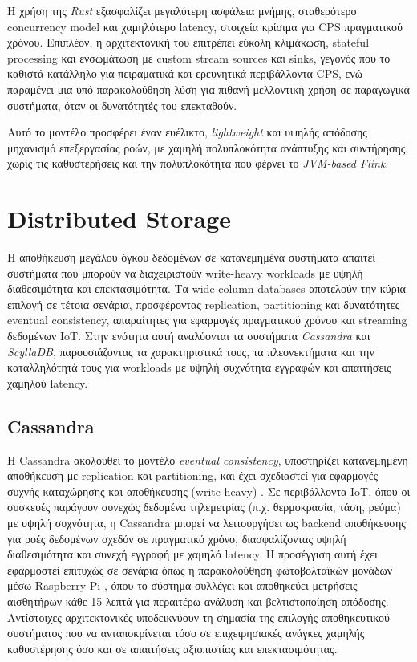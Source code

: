 Η χρήση της \textit{Rust} εξασφαλίζει μεγαλύτερη ασφάλεια μνήμης, σταθερότερο
concurrency model και χαμηλότερο latency, στοιχεία κρίσιμα για CPS πραγματικού
χρόνου. Επιπλέον, η αρχιτεκτονική του επιτρέπει εύκολη κλιμάκωση, stateful
processing και ενσωμάτωση με custom stream sources και sinks, γεγονός που το
καθιστά κατάλληλο για πειραματικά και ερευνητικά περιβάλλοντα CPS, ενώ
παραμένει μια υπό παρακολούθηση λύση για πιθανή μελλοντική χρήση σε παραγωγικά
συστήματα, όταν οι δυνατότητές του επεκταθούν.

Αυτό το μοντέλο προσφέρει έναν ευέλικτο, \textit{lightweight} και υψηλής
απόδοσης μηχανισμό επεξεργασίας ροών, με χαμηλή πολυπλοκότητα ανάπτυξης και
συντήρησης, χωρίς τις καθυστερήσεις και την πολυπλοκότητα που φέρνει το
\textit{JVM-based Flink}.

\section{Distributed Storage}

Η αποθήκευση μεγάλου όγκου δεδομένων σε κατανεμημένα συστήματα απαιτεί
συστήματα που μπορούν να διαχειριστούν write-heavy workloads με υψηλή
διαθεσιμότητα και επεκτασιμότητα. Τα wide-column databases αποτελούν την κύρια
επιλογή σε τέτοια σενάρια, προσφέροντας replication, partitioning και
δυνατότητες eventual consistency, απαραίτητες για εφαρμογές πραγματικού χρόνου
και streaming δεδομένων IoT. Στην ενότητα αυτή αναλύονται τα συστήματα
\textit{Cassandra} και \textit{ScyllaDB}, παρουσιάζοντας τα χαρακτηριστικά
τους, τα πλεονεκτήματα και την καταλληλότητά τους για workloads με υψηλή
συχνότητα εγγραφών και απαιτήσεις χαμηλού latency.

\subsection{Cassandra}

Η Cassandra ακολουθεί το μοντέλο \textit{eventual consistency}, υποστηρίζει
κατανεμημένη αποθήκευση με replication και partitioning, και έχει σχεδιαστεί
για εφαρμογές συχνής καταχώρησης και αποθήκευσης (write-heavy)
\cite{cassandrawp}. Σε περιβάλλοντα IoT, όπου οι συσκευές παράγουν συνεχώς
δεδομένα τηλεμετρίας (π.χ. θερμοκρασία, τάση, ρεύμα) με υψηλή συχνότητα, η
Cassandra μπορεί να λειτουργήσει ως backend αποθήκευσης για ροές δεδομένων
σχεδόν σε πραγματικό χρόνο, διασφαλίζοντας υψηλή διαθεσιμότητα και συνεχή
εγγραφή με χαμηλό latency. Η προσέγγιση αυτή έχει εφαρμοστεί επιτυχώς σε
σενάρια όπως η παρακολούθηση φωτοβολταϊκών μονάδων μέσω Raspberry Pi
\cite{iotcassandra}, όπου το σύστημα συλλέγει και αποθηκεύει μετρήσεις
αισθητήρων κάθε 15 λεπτά για περαιτέρω ανάλυση και βελτιστοποίηση απόδοσης.
Αντίστοιχες αρχιτεκτονικές υποδεικνύουν τη σημασία της επιλογής αποθηκευτικού
συστήματος που να ανταποκρίνεται τόσο σε επιχειρησιακές ανάγκες χαμηλής
καθυστέρησης όσο και σε απαιτήσεις αξιοπιστίας και επεκτασιμότητας.

